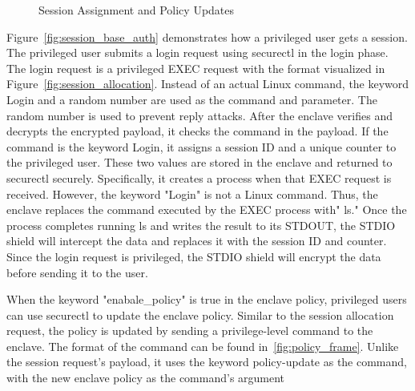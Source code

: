 \begin{figure}[!htb]
\begin{minipage}{0.9\textwidth}
\begin{subcolumns}[0.62\textwidth]
    \nextsubfigure
    \end{subcolumns}
    \end{minipage}
    
    \caption[Session Assignment and Policy Updates]{Session Assignment and Policy Updates}
    \label{fig:session_policy}
\end{figure}


Figure~\ref{fig:session_base_auth} demonstrates how a privileged user gets a session. The privileged user submits a login request using securectl in the login phase. The login request is a privileged EXEC request with the format visualized in Figure~\ref{fig:session_allocation}. Instead of an actual Linux command, the keyword Login and a random number 
are used as the command and parameter. The random number is used to prevent reply attacks. After the enclave verifies and decrypts the encrypted payload, it checks the command in the payload. If the command is the keyword Login, it assigns a session ID and a unique counter to the privileged user. 
These two values are stored in the enclave and returned to securectl securely. Specifically, it creates a process when that EXEC request is received. However, the keyword "Login" is not a Linux command. Thus, the enclave replaces the command executed by the EXEC process with" ls." Once the process 
completes running ls and writes the result to its STDOUT, the STDIO shield will intercept the data and replaces it with the session ID and counter. Since the login request is privileged, the STDIO shield will encrypt the data before sending it to the user. 

When the keyword "enabale\_policy" is true in the enclave policy, privileged users can use securectl to update the enclave policy. Similar to the session allocation request, the policy is updated by sending a privilege-level command to the enclave. The format of the command can be found in~\ref{fig:policy_frame}. Unlike 
the session request's payload, it uses the keyword policy-update as the command, with the new enclave policy as the command's argument

